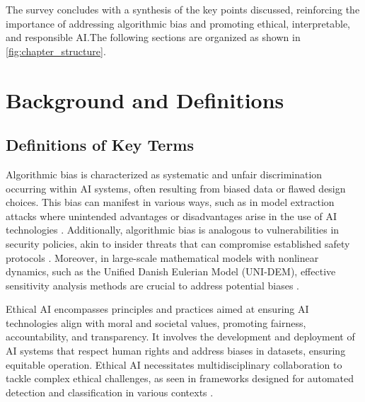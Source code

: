 The survey concludes with a synthesis of the key points discussed, reinforcing the importance of addressing algorithmic bias and promoting ethical, interpretable, and responsible AI.The following sections are organized as shown in \autoref{fig:chapter_structure}.









\section{Background and Definitions} \label{sec:Background and Definitions}



\subsection{Definitions of Key Terms} \label{subsec:Definitions of Key Terms}



Algorithmic bias is characterized as systematic and unfair discrimination occurring within AI systems, often resulting from biased data or flawed design choices. This bias can manifest in various ways, such as in model extraction attacks where unintended advantages or disadvantages arise in the use of AI technologies \cite{wang2024espewrobustcopyrightprotection}. Additionally, algorithmic bias is analogous to vulnerabilities in security policies, akin to insider threats that can compromise established safety protocols \cite{kammller2020applyingisabelleinsiderframework}. Moreover, in large-scale mathematical models with nonlinear dynamics, such as the Unified Danish Eulerian Model (UNI-DEM), effective sensitivity analysis methods are crucial to address potential biases \cite{dimov2017multidimensionalsensitivityanalysislargescale}.



Ethical AI encompasses principles and practices aimed at ensuring AI technologies align with moral and societal values, promoting fairness, accountability, and transparency. It involves the development and deployment of AI systems that respect human rights and address biases in datasets, ensuring equitable operation. Ethical AI necessitates multidisciplinary collaboration to tackle complex ethical challenges, as seen in frameworks designed for automated detection and classification in various contexts \cite{gan2019correlatedutilitybasedpatternmining}.



